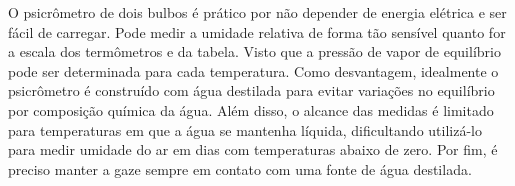 O psicrômetro de dois bulbos é prático por não depender de energia elétrica e ser fácil de carregar. Pode medir a umidade relativa de forma tão sensível quanto for a escala dos termômetros e da tabela. Visto que a pressão de vapor de equilíbrio pode ser determinada para cada temperatura. Como desvantagem, idealmente o psicrômetro é construído com água destilada para evitar variações no equilíbrio por composição química da água. Além disso, o alcance das medidas é limitado para temperaturas em que a água se mantenha líquida, dificultando utilizá-lo para medir umidade do ar em dias com temperaturas abaixo de zero. Por fim, é preciso manter a gaze sempre em contato com uma fonte de água destilada.

